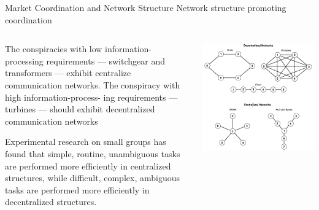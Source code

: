\documentclass[notes, aspectratio=1610]{beamer}
\begin{document}
\begin{frame}{Market Coordination and Network Structure}
	{Network structure promoting coordination}

	\small

	\begin{columns}
			\begin{column}{0.5\textwidth}



		\begin{tcolorbox}[
			colback=base_c!5!white,
			colframe=base_c!90!black,
			title={\centering Proposition 2}]
			\footnotesize The conspiracies with low information-processing 
			requirements --- switchgear and transformers --- 
			exhibit centralize communication networks.
			The conspiracy with high information-process- ing
			requirements --- turbines --- should exhibit decentralized
			communication networks \end{tcolorbox}

		\pause

		\begin{tcolorbox}[
			colback=comp_c!5!white,
			colframe=comp_c!90!black,
			title={\centering \small Argument for Proposition 2}]
			\footnotesize Experimental research on small groups has found that 
			simple, routine, unambiguous tasks are performed more 
			efficiently in centralized structures, while difficult, 
			complex, ambiguous tasks are performed more efficiently 
			in decentralized structures.
		\end{tcolorbox}

		\end{column}

		\pause

		\begin{column}{0.5\textwidth}
			\includegraphics[width=1\textwidth]{images/centralization}


\end{column}
\end{columns}
\end{frame}
\end{document}
